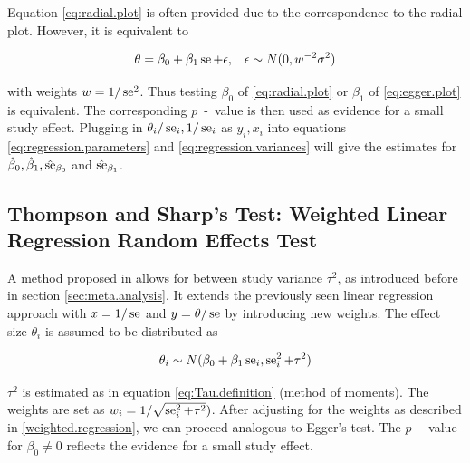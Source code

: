 \documentclass[11pt,a4paper,twoside]{book}\usepackage[]{graphicx}\usepackage[]{color}
\begin{document}
Equation \eqref{eq:radial.plot} is often provided due to the correspondence to the radial plot. However, it is equivalent to

\begin{align}
\theta &= \beta_0 + \beta_1 \operatorname{se} + \epsilon, & \epsilon \sim N(0, w^{-2}\sigma^2) \label{eq:egger.plot}
\end{align}

with weights $w = 1/\operatorname{se}^2$. Thus testing $\beta_0$ of \eqref{eq:radial.plot} or $\beta_1$ of \eqref{eq:egger.plot} is equivalent. The corresponding  $p$\hspace{0.4mm}~-~value is then used as evidence for a small study effect. Plugging in  $\theta_i/\operatorname{se}_i, 1/\operatorname{se}_i$ as $y_i, x_i$ into equations \eqref{eq:regression.parameters} and \eqref{eq:regression.variances} will give the estimates for $\hat{\beta}_0, \hat{\beta}_1,\hat{\operatorname{se}}_{\beta_0}$ and $\hat{\operatorname{se}}_{\beta_1}$.



\subsection{Thompson and Sharp's Test: Weighted Linear Regression Random Effects Test} \label{sec:Thompson}
A method proposed in \citet{thompson.sharp} allows for between study variance $\tau^2$, as introduced before in section \ref{sec:meta.analysis}. It extends the previously seen linear regression approach with $x = 1/\operatorname{se}$ and $y = \theta/\operatorname{se}$ by introducing new weights. The effect size $\theta_i$ is assumed to be distributed as

\begin{align}
\theta_i \sim N(\beta_0 + \beta_1 \operatorname{se}_i, \operatorname{se}_i^2 + \tau^2) \label{t.sharp.regression}
\end{align}

$\tau^2$ is estimated as in equation \eqref{eq:Tau.definition} (method of moments). %
The weights are set as $w_i = 1/\sqrt{\operatorname{se}_i^2 + \tau^2})$. After adjusting for the weights as described in \ref{weighted.regression}, we can proceed analogous to Egger's test. The  $p$\hspace{0.4mm}~-~value for $\beta_{0} \neq 0$ reflects the evidence for a small study effect.
\end{document}
